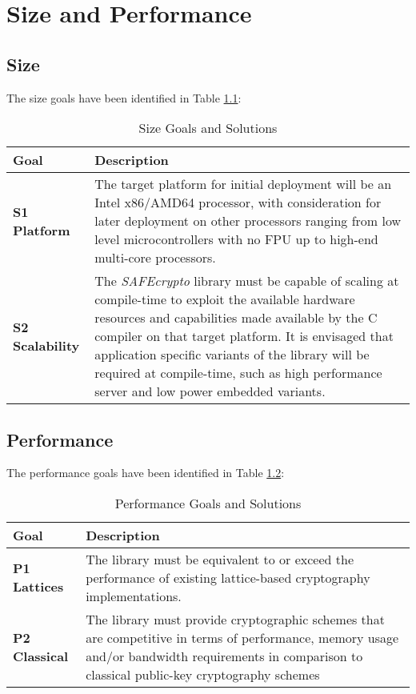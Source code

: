 \chapter{Size and Performance}
\label{ch_size_and_performance}

\section{Size}

The size goals have been identified in Table \ref{table:size_goals}:

\begin{table}[h]
\centering
\caption{Size Goals and Solutions}
\label{table:size_goals}
\begin{tabularx}{\textwidth}{l p{13cm}}
\toprule
\textbf{Goal} &\textbf{Description}  \\
\midrule
\textbf{S1 Platform} &The target platform for initial deployment will be an Intel x86/AMD64 processor, with consideration for later deployment on other processors ranging from low level microcontrollers with no FPU up to high-end multi-core processors. \\
\midrule
\textbf{S2 Scalability} &The \textit{SAFEcrypto} library must be capable of scaling at compile-time to exploit the available hardware resources and capabilities made available by the C compiler on that target platform. It is envisaged that application specific variants of the library will be required at compile-time, such as high performance server and low power embedded variants. \\
\bottomrule
\end{tabularx}
\end{table}



\section{Performance}

The performance goals have been identified in Table \ref{table:performance_goals}:

\begin{table}[h]
\centering
\caption{Performance Goals and Solutions}
\label{table:performance_goals}
\begin{tabularx}{\textwidth}{l p{13cm}}
\toprule
\textbf{Goal} &\textbf{Description}  \\
\midrule
\textbf{P1 Lattices} &The library must be equivalent to or exceed the performance of existing lattice-based cryptography implementations. \\
\midrule
\textbf{P2 Classical} &The library must provide cryptographic schemes that are competitive in terms of performance, memory usage and/or bandwidth requirements in comparison to classical public-key cryptography schemes \\
\bottomrule
\end{tabularx}
\end{table}

